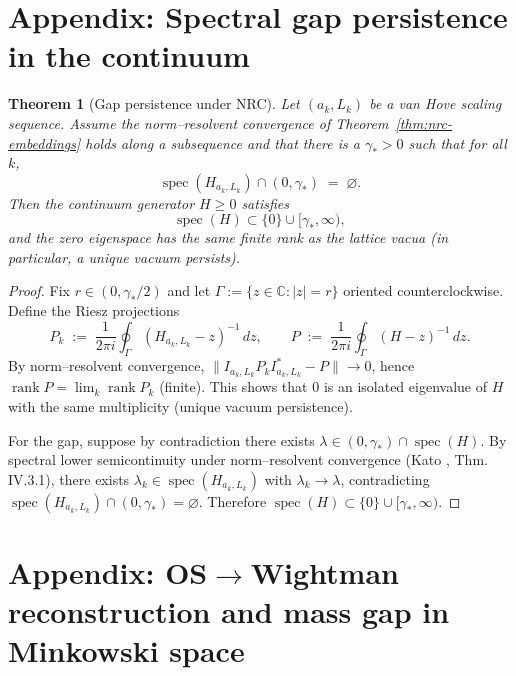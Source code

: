 \documentclass[11pt]{amsart}
\theoremstyle{plain}
\newtheorem{theorem}{Theorem}[section]
\theoremstyle{definition}
\theoremstyle{remark}
\begin{document}
\medskip
\section{Appendix: Spectral gap persistence in the continuum}

\begin{theorem}[Gap persistence under NRC]\label{thm:gap-persist-cont}
Let $(a_k,L_k)$ be a van Hove scaling sequence. Assume the norm--resolvent convergence of Theorem~\ref{thm:nrc-embeddings} holds along a subsequence and that there is a $\gamma_*>0$ such that for all $k$,
\[
  \operatorname{spec}(H_{a_k,L_k})\cap(0,\gamma_*)\;=\;\varnothing.
\]
Then the continuum generator $H\ge 0$ satisfies
\[
  \operatorname{spec}(H)\subset \{0\}\cup[\gamma_*,\infty),
\]
and the zero eigenspace has the same finite rank as the lattice vacua (in particular, a unique vacuum persists).
\end{theorem}
\begin{proof}
Fix $r\in(0,\gamma_*/2)$ and let $\Gamma:=\{z\in\mathbb C:|z|=r\}$ oriented counterclockwise. Define the Riesz projections
\[
  P_k\;:=\;\frac{1}{2\pi i}\oint_\Gamma (H_{a_k,L_k}-z)^{-1}\,dz,\qquad
  P\;:=\;\frac{1}{2\pi i}\oint_\Gamma (H-z)^{-1}\,dz.
\]
By norm--resolvent convergence, $\|I_{a_k,L_k} P_k I_{a_k,L_k}^*-P\|\to 0$, hence $\operatorname{rank}P=\lim_k \operatorname{rank}P_k$ (finite). This shows that $0$ is an isolated eigenvalue of $H$ with the same multiplicity (unique vacuum persistence).

For the gap, suppose by contradiction there exists $\lambda\in (0,\gamma_*)\cap\operatorname{spec}(H)$. By spectral lower semicontinuity under norm--resolvent convergence (Kato \cite{Kato1995}, Thm. IV.3.1), there exists $\lambda_k\in \operatorname{spec}(H_{a_k,L_k})$ with $\lambda_k\to \lambda$, contradicting $\operatorname{spec}(H_{a_k,L_k})\cap(0,\gamma_*)=\varnothing$. Therefore $\operatorname{spec}(H)\subset \{0\}\cup[\gamma_*,\infty)$.
\end{proof}

\medskip
\section{Appendix: OS$\to$Wightman reconstruction and mass gap in Minkowski space}
\end{document}
